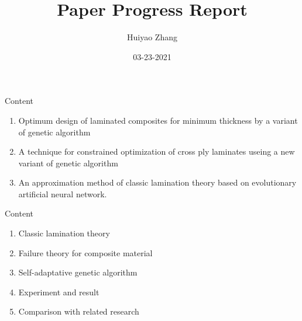 \documentclass{beamer}
\title{Paper Progress Report}
\author{Huiyao Zhang}
\institute{Kyoto Institue of Technology}
\date{03-23-2021}
\begin{document}
\begin{frame}
    \titlepage
\end{frame}

\begin{frame}[c]{Content} 
    \begin{enumerate}
        \item Optimum design of laminated composites for minimum thickness by a variant of genetic algorithm
        \item A technique for constrained optimization of cross ply laminates useing a new variant of genetic algorithm
        \item An approximation method of classic lamination theory based on evolutionary artificial neural network.
    \end{enumerate}
\end{frame}

\begin{frame}[c]{Content} 
    \begin{enumerate}
        \item Classic lamination theory
        \item Failure theory for composite material
        \item Self-adaptative genetic algorithm
        \item Experiment and result
        \item Comparison with related research
    \end{enumerate}
\end{frame}
\end{document}

